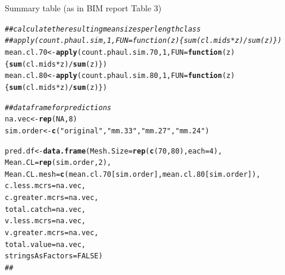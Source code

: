 \documentclass[12pt]{article}\usepackage[]{graphicx}\usepackage[]{color}
\makeatletter
\newcommand{\hlnum}[1]{\textcolor[rgb]{0.686,0.059,0.569}{#1}}%
\newcommand{\hlstr}[1]{\textcolor[rgb]{0.192,0.494,0.8}{#1}}%
\newcommand{\hlcom}[1]{\textcolor[rgb]{0.678,0.584,0.686}{\textit{#1}}}%
\newcommand{\hlopt}[1]{\textcolor[rgb]{0,0,0}{#1}}%
\newcommand{\hlstd}[1]{\textcolor[rgb]{0.345,0.345,0.345}{#1}}%
\newcommand{\hlkwa}[1]{\textcolor[rgb]{0.161,0.373,0.58}{\textbf{#1}}}%
\newcommand{\hlkwb}[1]{\textcolor[rgb]{0.69,0.353,0.396}{#1}}%
\newcommand{\hlkwc}[1]{\textcolor[rgb]{0.333,0.667,0.333}{#1}}%
\newcommand{\hlkwd}[1]{\textcolor[rgb]{0.737,0.353,0.396}{\textbf{#1}}}%
\newenvironment{kframe}{%
 \def\at@end@of@kframe{}%
 \ifinner\ifhmode%
  \def\at@end@of@kframe{\end{minipage}}%
  \begin{minipage}{\columnwidth}%
 \fi\fi%
 \def\FrameCommand##1{\hskip\@totalleftmargin \hskip-\fboxsep
 \colorbox{shadecolor}{##1}\hskip-\fboxsep
     \hskip-\linewidth \hskip-\@totalleftmargin \hskip\columnwidth}%
 \MakeFramed {\advance\hsize-\width
   \@totalleftmargin\z@ \linewidth\hsize
   \@setminipage}}%
 {\par\unskip\endMakeFramed%
 \at@end@of@kframe}
\newenvironment{knitrout}{}{} %
\makeatother
\begin{document}
Summary table (as in BIM report Table 3)
\begin{knitrout}\footnotesize
{}\color{fgcolor}\begin{kframe}
\begin{alltt}
\hlcom{## calculate the resulting mean sizes per length class}
\hlcom{##apply(count.phaul.sim, 1, FUN = function(z)\{sum(cl.mids * z) / sum(z)\})}
\hlstd{mean.cl.70} \hlkwb{<-} \hlkwd{apply}\hlstd{(count.phaul.sim.70,} \hlnum{1}\hlstd{,} \hlkwc{FUN} \hlstd{=} \hlkwa{function}\hlstd{(}\hlkwc{z}\hlstd{)\{}\hlkwd{sum}\hlstd{(cl.mids} \hlopt{*} \hlstd{z)} \hlopt{/} \hlkwd{sum}\hlstd{(z)\})}
\hlstd{mean.cl.80} \hlkwb{<-} \hlkwd{apply}\hlstd{(count.phaul.sim.80,} \hlnum{1}\hlstd{,} \hlkwc{FUN} \hlstd{=} \hlkwa{function}\hlstd{(}\hlkwc{z}\hlstd{)\{}\hlkwd{sum}\hlstd{(cl.mids} \hlopt{*} \hlstd{z)} \hlopt{/} \hlkwd{sum}\hlstd{(z)\})}

\hlcom{## data frame for predictions}
\hlstd{na.vec} \hlkwb{<-} \hlkwd{rep}\hlstd{(}\hlnum{NA}\hlstd{,} \hlnum{8}\hlstd{)}
\hlstd{sim.order} \hlkwb{<-} \hlkwd{c}\hlstd{(}\hlstr{"original"}\hlstd{,} \hlstr{"mm.33"}\hlstd{,} \hlstr{"mm.27"}\hlstd{,} \hlstr{"mm.24"}\hlstd{)}

\hlstd{pred.df} \hlkwb{<-} \hlkwd{data.frame}\hlstd{(}\hlkwc{Mesh.Size} \hlstd{=} \hlkwd{rep}\hlstd{(}\hlkwd{c}\hlstd{(}\hlnum{70}\hlstd{,} \hlnum{80}\hlstd{),} \hlkwc{each} \hlstd{=} \hlnum{4}\hlstd{),}
                      \hlkwc{Mean.CL} \hlstd{=} \hlkwd{rep}\hlstd{(sim.order,} \hlnum{2}\hlstd{),}
                      \hlkwc{Mean.CL.mesh} \hlstd{=} \hlkwd{c}\hlstd{(mean.cl.70[sim.order], mean.cl.80[sim.order]),}
                      \hlkwc{c.less.mcrs} \hlstd{= na.vec,}
                      \hlkwc{c.greater.mcrs} \hlstd{= na.vec,}
                      \hlkwc{total.catch} \hlstd{= na.vec,}
                      \hlkwc{v.less.mcrs} \hlstd{= na.vec,}
                      \hlkwc{v.greater.mcrs} \hlstd{= na.vec,}
                      \hlkwc{total.value} \hlstd{= na.vec,}
                      \hlkwc{stringsAsFactors} \hlstd{=} \hlnum{FALSE}\hlstd{)}
\hlcom{##}


\end{alltt}
\end{kframe}
\end{knitrout}
\end{document}
